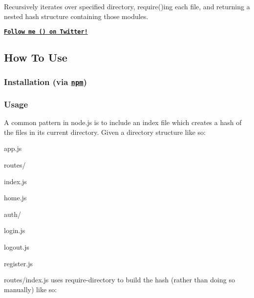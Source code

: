 Recursively iterates over specified directory, {\ttfamily require()}\textquotesingle{}ing each file, and returning a nested hash structure containing those modules.

{\bfseries \href{https://twitter.com/intent/user?screen_name=troygoode}{\tt Follow me () on Twitter!}}

\href{https://nodei.co/npm/require-directory/}{\tt }

\href{http://travis-ci.org/troygoode/node-require-directory}{\tt }

\subsection*{How To Use}

\subsubsection*{Installation (via \href{https://npmjs.org/package/require-directory}{\tt npm})}




\subsubsection*{Usage}

A common pattern in node.\+js is to include an index file which creates a hash of the files in its current directory. Given a directory structure like so\+:


\begin{DoxyItemize}
\item app.\+js
\item routes/
\begin{DoxyItemize}
\item index.\+js
\item home.\+js
\item auth/
\begin{DoxyItemize}
\item login.\+js
\item logout.\+js
\item register.\+js
\end{DoxyItemize}
\end{DoxyItemize}
\end{DoxyItemize}

{\ttfamily routes/index.\+js} uses {\ttfamily require-\/directory} to build the hash (rather than doing so manually) like so\+:


